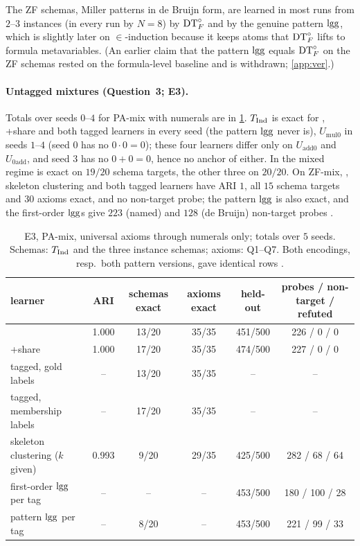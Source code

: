 The ZF schemas, Miller patterns in de Bruijn form, are learned in most runs from $2$--$3$ instances (in every run by $N=8$) by $\mathrm{DT}^{\circ}_{F}$ and by the genuine pattern $\mathrm{lgg}$, which is slightly later on $\in$-induction because it keeps atoms that $\mathrm{DT}^{\circ}_{F}$ lifts to formula metavariables. (An earlier claim that the pattern $\mathrm{lgg}$ equals $\mathrm{DT}^{\circ}_{F}$ on the ZF schemas rested on the formula-level baseline and is withdrawn; \cref{app:ver}.)

\paragraph{Untagged mixtures (Question~3; E3).}
Totals over seeds $0$--$4$ for PA-mix with numerals are in \cref{tab:exp:e3}. $T_{\mathrm{Ind}}$ is exact for \DTRC{}, \DTRC{}+share and both tagged learners in every seed (the pattern $\mathrm{lgg}$ never is), $U_{\mathrm{mul0}}$ in seeds $1$--$4$ (seed $0$ has no $0\cdot0=0$); these four learners differ only on $U_{\mathrm{add0}}$ and $U_{\mathrm{0add}}$, and seed $3$ has no $0+0=0$, hence no anchor of either. In the mixed regime \DTRC{} is exact on $19/20$ schema targets, the other three on $20/20$. On ZF-mix, \DTRC{}, skeleton clustering and both tagged learners have ARI $1$, all $15$ schema targets and $30$ axioms exact, and no non-target probe; the pattern $\mathrm{lgg}$ is also exact, and the first-order $\mathrm{lgg}$s give $223$ (named) and $128$ (de Bruijn) non-target probes .

\begin{table}[t]
\centering\small
\setlength{\tabcolsep}{3pt}
\begin{tabular}{@{}lccccc@{}}
\toprule
learner & ARI & schemas exact & axioms exact & held-out & probes / non-target / refuted\\
\midrule
\DTRC{} & 1.000 & 13/20 & 35/35 & 451/500 & 226 / 0 / 0\\
\DTRC{}+share & 1.000 & 17/20 & 35/35 & 474/500 & 227 / 0 / 0\\
tagged, gold labels & -- & 13/20 & 35/35 & -- & --\\
tagged, membership labels & -- & 17/20 & 35/35 & -- & --\\
skeleton clustering ($k$ given) & 0.993 & 9/20 & 29/35 & 425/500 & 282 / 68 / 64\\
first-order $\mathrm{lgg}$ per tag & -- & -- & -- & 453/500 & 180 / 100 / 28\\
pattern $\mathrm{lgg}$ per tag & -- & 8/20 & -- & 453/500 & 221 / 99 / 33\\
\bottomrule
\end{tabular}
\caption{E3, PA-mix, universal axioms through numerals only; totals over $5$ seeds. Schemas: $T_{\mathrm{Ind}}$ and the three instance schemas; axioms: Q1--Q7. Both encodings, resp.\ both pattern versions, gave identical rows .}
\label{tab:exp:e3}
\end{table}

